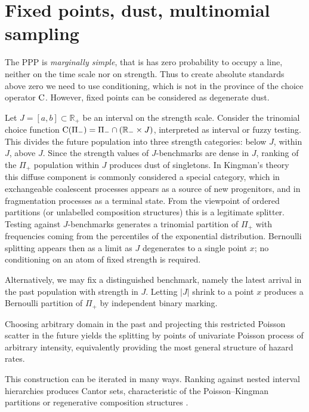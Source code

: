 \documentclass[11pt]{article}
\newcommand{\RR}{\mathbb{R}}
\theoremstyle{plain}
\theoremstyle{definition}
\begin{document}
\section{Fixed points, dust, multinomial sampling}
\label{sec:dust}
 
The PPP is {\it marginally simple}, that is has zero probability to occupy a line, neither on the time scale nor on strength. 
Thus to create absolute standards above zero we need to use conditioning, which is not in the province of the choice operator $\rm C$. However, fixed points can be considered as degenerate dust.
 
Let \(J=[a,b]\subset\RR_+\) be an interval on the strength scale. Consider the trinomial choice function \({\rm C}(\Pi_-)=\Pi_-\cap(\RR_-\times J)\), interpreted as interval or fuzzy testing. This divides the future population into three strength categories: below \(J\), within \(J\), above \(J\). Since the strength values of \(J\)-benchmarks are dense in \(J\), ranking of the \(\Pi_+\) population within \(J\) produces dust of singletons.
 In Kingman's theory this diffuse component is commonly considered a special category, which in exchangeable coalescent processes appears as a source of new progenitors, and in fragmentation processes as a terminal state. From the viewpoint of ordered partitions (or unlabelled composition structures) this is a legitimate splitter.
 Testing against \(J\)-benchmarks generates a trinomial partition of \(\Pi_+\) with frequencies coming from the percentiles of the exponential distribution. Bernoulli splitting appears then as a limit as \(J\) degenerates to a single point \(x\); no conditioning on an atom of fixed strength is required.
 
Alternatively, we may fix a distinguished benchmark, namely the latest arrival in the past population with strength in \(J\). Letting \(|J|\) shrink to a point \(x\) produces a Bernoulli partition of \(\Pi_+\)
by  independent binary marking.


Choosing arbitrary domain in the past and projecting this restricted Poisson scatter in the future yields the  splitting by points of univariate Poisson process of arbitrary intensity, equivalently providing the most general structure of hazard rates.

This construction can be iterated in many ways. Ranking against nested interval hierarchies produces Cantor sets, characteristic of the Poisson--Kingman partitions \cite{Pitman2006} or regenerative composition structures
\cite{GnedinPitman2005}.
 
\end{document}
